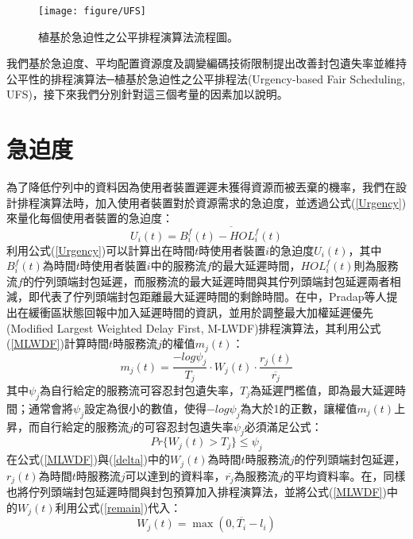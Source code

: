 \begin{figure}[H]
\centering
\vskip 20pt
\texttt{[image: figure/UFS]}
\caption 
{\label{fig:UFS}植基於急迫性之公平排程演算法流程圖。}
\end{figure}

我們基於急迫度、平均配置資源度及調變編碼技術限制提出改善封包遺失率並維持公平性的排程演算法─植基於急迫性之公平排程法(Urgency-based Fair Scheduling, UFS)，接下來我們分別針對這三個考量的因素加以說明。
\section{急迫度}
為了降低佇列中的資料因為使用者裝置遲遲未獲得資源而被丟棄的機率，我們在設計排程演算法時，加入使用者裝置對於資源需求的急迫度，並透過公式(\ref{Urgency})來量化每個使用者裝置的急迫度：
\begin{equation}
\label{Urgency}
U_i(t)=\overline{B_i^f(t)-HOL_i^f(t)}
\end{equation}
利用公式(\ref{Urgency})可以計算出在時間$t$時使用者裝置$i$的急迫度$U_i(t)$，其中$B_i^f(t)$為時間$t$時使用者裝置$i$中的服務流$f$的最大延遲時間，$HOL_i^f(t)$則為服務流$f$的佇列頭端封包延遲，而服務流的最大延遲時間與其佇列頭端封包延遲兩者相減，即代表了佇列頭端封包距離最大延遲時間的剩餘時間。在\cite{prad2009}中，Pradap等人提出在緩衝區狀態回報中加入延遲時間的資訊，並用於調整最大加權延遲優先(Modified Largest Weighted Delay First, M-LWDF)排程演算法\cite{andr2001}，其利用公式(\ref{MLWDF})計算時間$t$時服務流$j$的權值$m_j(t)$：
\begin{equation}
\label{MLWDF}
m_j(t)=\frac{-log\psi_j}{T_j}\cdot W_j(t)\cdot\frac{r_j(t)}{\overline{r_j}}
\end{equation}
其中$\psi_j$為自行給定的服務流可容忍封包遺失率，$T_j$為延遲門檻值，即為最大延遲時間；通常會將$\psi_j$設定為很小的數值，使得$-log\psi_j$為大於1的正數，讓權值$m_j(t)$上昇，而自行給定的服務流$j$的可容忍封包遺失率$\psi_j$必須滿足公式：
\begin{equation}
\label{delta}
Pr\{W_j(t)>T_j\}\leq \psi_j
\end{equation}
在公式(\ref{MLWDF})與(\ref{delta})中的$W_j(t)$為時間$t$時服務流$j$的佇列頭端封包延遲，$r_j(t)$為時間$t$時服務流$j$可以達到的資料率，$\overline{r_j}$為服務流$j$的平均資料率。在\cite{prad2009}，同樣也將佇列頭端封包延遲時間與封包預算加入排程演算法，並將公式(\ref{MLWDF})中的$W_j(t)$利用公式(\ref{remain})代入：
\begin{equation}
\label{remain}
W_j(t)=\max(0,\overline{T_i}-l_i)
\end{equation}
